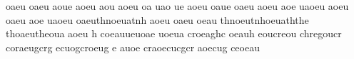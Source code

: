 oaeu
oaeu
aoue
aoeu
aou
aoeu
oa
uao
ue
aoeu
oaue
oaeu
aoeu
aoe
uaoeu aoeu oaeu aoe uaoeu oaeuthnoeuatnh 
aoeu oaeu oeau thnoeutnhoeuaththe thoaeutheoua 
aoeu h
coeauueuoae uoeua croeaghc oeauh eoucreou chregoucr 
coraeugcrg ecuogcroeug e auoe craoecucgcr aoecug ceoeau 






